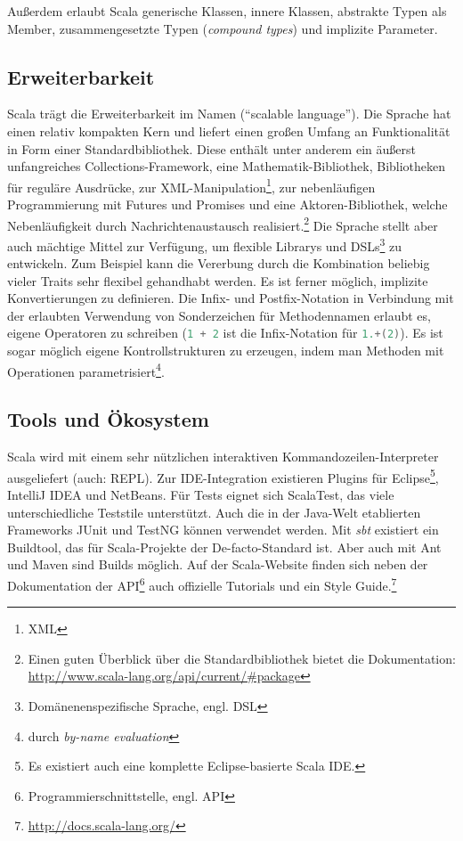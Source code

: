\documentclass[a4paper, 12pt, hidelinks, listof=totoc, listoftables=totoc, bibliography=totoc]{scrreprt}
\newcommand{\scala}[1]{\lstinline[language=Scala, style=inline]|#1|}
\begin{document}
Außerdem erlaubt Scala generische Klassen, innere Klassen, abstrakte Typen als Member, zusammengesetzte Typen (\emph{compound types}) und implizite Parameter.\cite[S. 16 ff., S. 205 ff.]{odersky2008.PIS}\cite[S. 113 ff.]{piepmeyer2010.GFP}\cite{scala-lang2011.CSS}

\subsection{Erweiterbarkeit}

Scala trägt die Erweiterbarkeit im Namen ("`scalable language"').
Die Sprache hat einen relativ kompakten Kern und liefert einen großen Umfang an Funktionalität in Form einer Standardbibliothek. Diese enthält unter anderem ein äußerst unfangreiches Collections-Framework, eine Mathematik-Bibliothek, Bibliotheken für reguläre Ausdrücke, zur XML-Manipulation\footnote{\ac{XML}}, zur nebenläufigen Programmierung mit Futures und Promises und eine Aktoren-Bibliothek, welche Nebenläufigkeit durch Nachrichtenaustausch realisiert.\footnote{Einen guten Überblick über die Standardbibliothek bietet die Dokumentation: \url{http://www.scala-lang.org/api/current/\#package}} Die Sprache stellt aber auch mächtige Mittel zur Verfügung, um flexible Librarys und DSLs\footnote{Domänenenspezifische Sprache, engl. \ac{DSL}} zu entwickeln. Zum Beispiel kann die Vererbung durch die Kombination beliebig vieler Traits sehr flexibel gehandhabt werden. Es ist ferner möglich, implizite Konvertierungen zu definieren. Die Infix- und Postfix-Notation in Verbindung mit der erlaubten Verwendung von Sonderzeichen für Methodennamen erlaubt es, eigene Operatoren zu schreiben \linebreak(\mbox{\scala{1 + 2}} ist die Infix-Notation für \scala{1.+(2)}). Es ist sogar möglich eigene Kontrollstrukturen zu erzeugen, indem man Methoden mit Operationen parametrisiert\footnote{durch \emph{by-name evaluation}}.\cite[S. 4 ff.]{odersky2008.PIS}

\subsection{Tools und Ökosystem}

Scala wird mit einem sehr nützlichen interaktiven Kommandozeilen-Interpreter ausgeliefert (auch: \ac{REPL}). Zur IDE-Integration existieren Plugins für Eclipse\footnote{Es existiert auch eine komplette Eclipse-basierte Scala IDE.}, IntelliJ IDEA und NetBeans. Für Tests eignet sich ScalaTest, das viele unterschiedliche Teststile unterstützt. Auch die in der Java-Welt etablierten Frameworks JUnit und TestNG können verwendet werden. Mit \emph{sbt} existiert ein Buildtool, das für Scala-Projekte der De-facto-Standard ist. Aber auch mit Ant und Maven sind Builds möglich. Auf der Scala-Website finden sich neben der Dokumentation der API\footnote{Programmierschnittstelle, engl. \ac{API}} auch offizielle Tutorials und ein Style Guide.\footnote{\url{http://docs.scala-lang.org/}}
\end{document}
